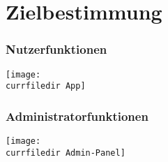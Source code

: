 \section{Zielbestimmung}

\begin{frame}\frametitle{Nutzerfunktionen}
    \begin{center}
    \texttt{[image: \\currfiledir App]}
    \end{center}
\end{frame}

\begin{frame}\frametitle{Administratorfunktionen}
    \begin{center}
    \texttt{[image: \\currfiledir Admin-Panel]}
    \end{center}
\end{frame}

